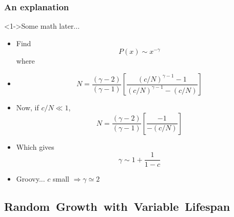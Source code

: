 \begin{frame}
  \frametitle{An explanation}

  \begin{block}<1->{Some math later...}
    \begin{itemize}
    \item<2-> Find
      $$ P(x) \sim x^{-\gamma} $$
      where
    \item<3->   
      $$
      N = \frac{(\gamma-2)}{(\gamma-1)}
      \left[
        \frac{(c/N)^{\gamma-1} - 1}
        {(c/N)^{\gamma-1} - (c/N)}
      \right]
      $$
    \item<4->
      Now, if $c/N \ll 1$, 
      $$
      N = \frac{(\gamma-2)}{(\gamma-1)}
      \left[
        \frac{- 1}
        {- (c/N)}
      \right]
      $$
    \item<5->
      Which gives
      $$
      \gamma  \sim 1 + \frac{1}{1-c}
      $$
    \item<6-> \alert{Groovy...}  $c$ small $\Rightarrow \gamma \simeq 2$
    \end{itemize}
  \end{block}
  

\end{frame}



\subsection{Random\ Growth\ with\ Variable\ Lifespan}

